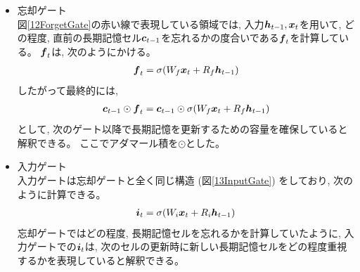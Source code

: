 \begin{itemize}
  \item 忘却ゲート\\
  図\ref{12ForgetGate}の赤い線で表現している領域では, 入力${\mbox{\boldmath{$h$}}}_{t-1},{\mbox{\boldmath{$x$}}}_t$を用いて, どの程度, 直前の長期記憶セル${\mbox{\boldmath{$c$}}}_{t-1}$を忘れるかの度合いである${\mbox{\boldmath{$f$}}}_{t}$を計算している。
  ${\mbox{\boldmath{$f$}}}_{t}$は, 次のようにかける。
\begin{equation}
 \begin{split}
  {\mbox{\boldmath{$f$}}}_{t} = \sigma (W_f {\mbox{\boldmath{$x$}}}_t + R_f {\mbox{\boldmath{$h$}}}_{t-1})
 \end{split}
\end{equation}  
  したがって最終的には, 
\begin{equation}
 \begin{split}
  {\mbox{\boldmath{$c$}}}_{t-1} \odot  {\mbox{\boldmath{$f$}}}_{t} 
  = {\mbox{\boldmath{$c$}}}_{t-1} \odot  \sigma (W_f {\mbox{\boldmath{$x$}}}_t + R_f {\mbox{\boldmath{$h$}}}_{t-1})
 \end{split}
\end{equation}
  として, 次のゲート以降で長期記憶を更新するための容量を確保していると解釈できる。
  ここでアダマール積を$\odot$とした。

  \item 入力ゲート\\
  入力ゲートは忘却ゲートと全く同じ構造 (図\ref{13InputGate}) をしており, 次のように計算できる。
\begin{equation}
 \begin{split}
  {\mbox{\boldmath{$i$}}}_{t} = \sigma (W_i {\mbox{\boldmath{$x$}}}_t + R_i {\mbox{\boldmath{$h$}}}_{t-1})
 \end{split}
\end{equation}
  忘却ゲートではどの程度, 長期記憶セルを忘れるかを計算していたように, 入力ゲートでの${\mbox{\boldmath{$i$}}}_{t}$は, 次のセルの更新時に新しい長期記憶セルをどの程度重視するかを表現していると解釈できる。
    

\end{itemize}
